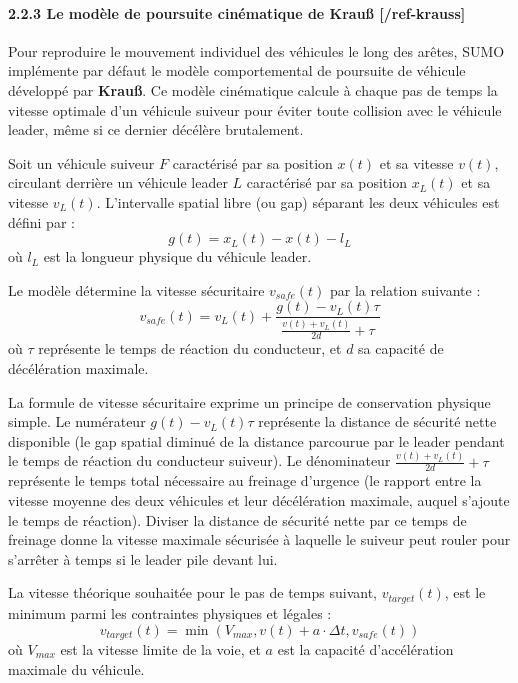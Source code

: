 \documentclass[10pt, a4paper]{article}
\begin{document}
\paragraph{2.2.3 Le modèle de poursuite cinématique de Krauß
{[}/ref-krauss{]}}\label{le-moduxe8le-de-poursuite-cinuxe9matique-de-krauuxdf-ref-krauss}

Pour reproduire le mouvement individuel des véhicules le long des
arêtes, SUMO implémente par défaut le modèle comportemental de poursuite
de véhicule développé par \textbf{Krauß}. Ce modèle cinématique calcule
à chaque pas de temps la vitesse optimale d'un véhicule suiveur pour
éviter toute collision avec le véhicule leader, même si ce dernier
décélère brutalement.

Soit un véhicule suiveur \(F\) caractérisé par sa position \(x(t)\) et
sa vitesse \(v(t)\), circulant derrière un véhicule leader \(L\)
caractérisé par sa position \(x_L(t)\) et sa vitesse \(v_L(t)\).
L'intervalle spatial libre (ou gap) séparant les deux véhicules est
défini par : \[g(t) = x_L(t) - x(t) - l_L\] où \(l_L\) est la longueur
physique du véhicule leader.

Le modèle détermine la vitesse sécuritaire \(v_{safe}(t)\) par la
relation suivante :
\[v_{safe}(t) = v_L(t) + \frac{g(t) - v_L(t)\tau}{\frac{v(t) + v_L(t)}{2d} + \tau}\]
où \(\tau\) représente le temps de réaction du conducteur, et \(d\) sa
capacité de décélération maximale.

La formule de vitesse sécuritaire exprime un principe de conservation
physique simple. Le numérateur \(g(t) - v_L(t)\tau\) représente la
distance de sécurité nette disponible (le gap spatial diminué de la
distance parcourue par le leader pendant le temps de réaction du
conducteur suiveur). Le dénominateur \(\frac{v(t) + v_L(t)}{2d} + \tau\)
représente le temps total nécessaire au freinage d'urgence (le rapport
entre la vitesse moyenne des deux véhicules et leur décélération
maximale, auquel s'ajoute le temps de réaction). Diviser la distance de
sécurité nette par ce temps de freinage donne la vitesse maximale
sécurisée à laquelle le suiveur peut rouler pour s'arrêter à temps si le
leader pile devant lui.

La vitesse théorique souhaitée pour le pas de temps suivant,
\(v_{target}(t)\), est le minimum parmi les contraintes physiques et
légales :
\[v_{target}(t) = \min\left( V_{max}, v(t) + a \cdot \Delta t, v_{safe}(t) \right)\]
où \(V_{max}\) est la vitesse limite de la voie, et \(a\) est la
capacité d'accélération maximale du véhicule.
\end{document}

